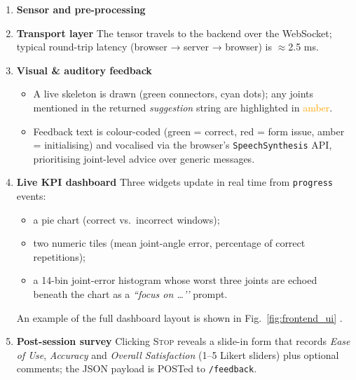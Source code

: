 \documentclass{article}
\begin{document}
\begin{enumerate}
  \item \textbf{Sensor and pre-processing}  

  \item \textbf{Transport layer}  
        The tensor travels to the backend over the WebSocket; typical
        round-trip latency (browser → server → browser) is
        \(\approx\)2.5 ms.

  \item \textbf{Visual \& auditory feedback}  
        \begin{itemize}
          \item A live skeleton is drawn (green connectors, cyan dots);
                any joints mentioned in the returned \emph{suggestion}
                string are highlighted in \textcolor{orange}{amber}.
          \item Feedback text is colour-coded
                (green = correct, red = form issue, amber = initialising)
                and vocalised via the browser’s
                \texttt{Speech\-Synthesis} API, prioritising joint-level
                advice over generic messages.
        \end{itemize}

  \item \textbf{Live KPI dashboard}  
        Three widgets update in real time from \verb|progress| events:
        \begin{itemize}
          \item a pie chart (correct vs.\ incorrect windows);
          \item two numeric tiles (mean joint-angle error, percentage of
                correct repetitions);
          \item a 14-bin joint-error histogram whose worst three joints
                are echoed beneath the chart as a \textit{“focus on …’’}
                prompt.
        \end{itemize}
        An example of the full dashboard layout is shown in Fig.~\ref{fig:frontend_ui} .

  \item \textbf{Post-session survey}  
        Clicking \textsc{Stop} reveals a slide-in form that records
        \emph{Ease of Use}, \emph{Accuracy} and
        \emph{Overall Satisfaction} (1–5 Likert sliders) plus optional
        comments; the JSON payload is POSTed to \verb|/feedback|.
\end{enumerate}
\end{document}
